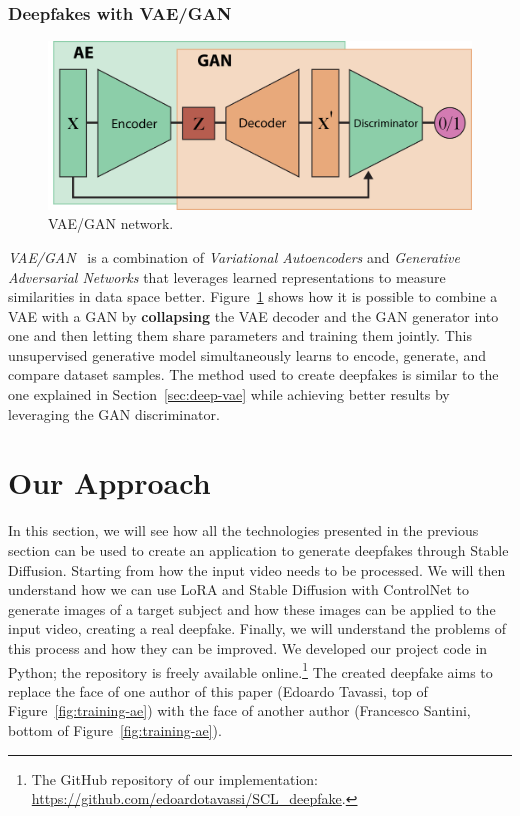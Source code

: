 \documentclass[preprint]{elsarticle}
\begin{document}
\subsubsection{Deepfakes with VAE/GAN}\label{sect:vaegan}

\begin{figure}[b]
	\centering
    \includegraphics[scale=0.75]{img/svg/VaeGan.png}
	\caption{VAE/GAN network.}\label{fig:vae-gan}
\end{figure}


\emph{VAE/GAN}~\cite{larsen2016autoencoding} is a combination of \emph{Variational Autoencoders} and \emph{Generative Adversarial Networks} that leverages learned representations to measure similarities in data space better. Figure~\ref{fig:vae-gan} shows how it is possible to combine a VAE with a GAN by \textbf{collapsing} the VAE decoder and the GAN generator  into one and then letting them share parameters and training them jointly.
This unsupervised generative model simultaneously learns to encode, generate, and compare dataset samples. 
The method used to create deepfakes is similar to the one explained in Section~\ref{sec:deep-vae} while achieving  better results by leveraging the GAN discriminator.



\section{Our Approach} \label{ch:project}

In this section, we will see how all the technologies presented in the previous  section can be used to create an application to generate deepfakes through Stable Diffusion.  Starting from how the input video needs to be processed.  We will then understand how we can use LoRA and Stable Diffusion with ControlNet to  generate images of a target subject and how these images can be applied to the input video, 
creating a real deepfake.  Finally, we will understand the problems of this process and how they can be improved. We developed our project code in Python; the repository is freely available online.\footnote{The GitHub repository of our  implementation: \url{https://github.com/edoardotavassi/SCL_deepfake}.} The created deepfake aims to replace the face of one author of this paper (Edoardo Tavassi, top of  Figure~\ref{fig:training-ae}) with the face of another author (Francesco Santini, bottom of  Figure~\ref{fig:training-ae}).
\end{document}
